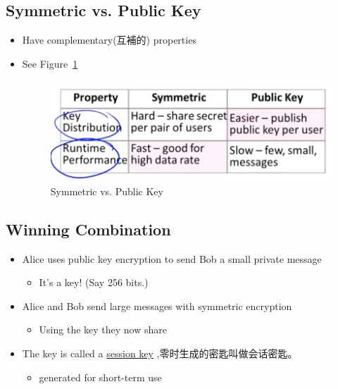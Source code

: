 \documentclass[12pt]{ctexart}   %
\begin{document}
	\subsection{Symmetric vs. Public Key}
	\begin{itemize}
		\item Have complementary(互補的) properties
		\item See Figure~\ref{fig:10-2-6}
		  
		\begin{figure}[h!] %
		\centering
		\includegraphics[scale=0.7]{images/10-2-6}
		\caption{Symmetric vs. Public Key}
		\label{fig:10-2-6}
		\end{figure}
	\end{itemize}

	\subsection{Winning Combination}
	\begin{itemize}
		\item Alice uses public key encryption to send Bob a small private message
		\begin{itemize}
			\item It's a key! (Say 256 bits.)
		\end{itemize}

		\item Alice and Bob send large messages with symmetric encryption
		\begin{itemize}
			\item Using the key they now share
		\end{itemize}

		\item The key is called a \underline{session key} ,零时生成的密匙叫做会话密匙。
		\begin{itemize}
			\item generated for short-term use
		\end{itemize}
	\end{itemize}
\end{document}
